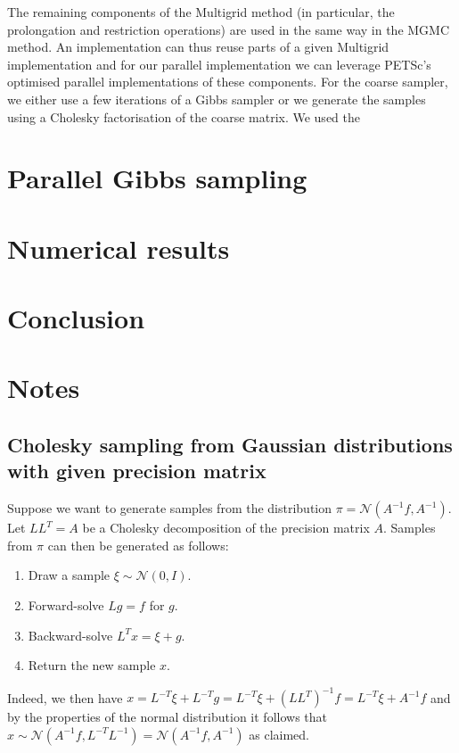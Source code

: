 \documentclass[
fontsize=11pt,
paper=a4,
numbers=noenddot
]{scrartcl}
\begin{document}
The remaining components of the Multigrid method (in particular, the prolongation and restriction operations) are used in the same way in the MGMC method. An implementation can thus reuse parts of a given Multigrid implementation and for our parallel implementation we can leverage PETSc's optimised parallel implementations of these components. For the coarse sampler, we either use a few iterations of a Gibbs sampler or we generate the samples using a Cholesky factorisation of the coarse matrix. We used the 

\section{Parallel Gibbs sampling}

\section{Numerical results}

\section{Conclusion}

\section{Notes}
\subsection{Cholesky sampling from Gaussian distributions with given precision matrix}
Suppose we want to generate samples from the distribution $\pi = \mathcal{N}(A^{-1} f, A^{-1})$. Let $LL^T = A$ be a Cholesky decomposition of the precision matrix $A$. Samples from $\pi$ can then be generated as follows:
\begin{enumerate}
    \item Draw a sample $\xi \sim \mathcal{N}(0,I)$.
    \item Forward-solve $L g = f$ for $g$.
    \item Backward-solve $L^T x = \xi + g$.
    \item Return the new sample $x$.
\end{enumerate}
Indeed, we then have $x = L^{-T} \xi + L^{-T} g = L^{-T} \xi + {(LL^T)}^{-1} f =  L^{-T} \xi + A^{-1} f$ and by the properties of the normal distribution it follows that $x \sim \mathcal{N}(A^{-1} f, L^{-T}L^{-1}) = \mathcal{N}(A^{-1} f, A^{-1})$ as claimed.
\end{document}
